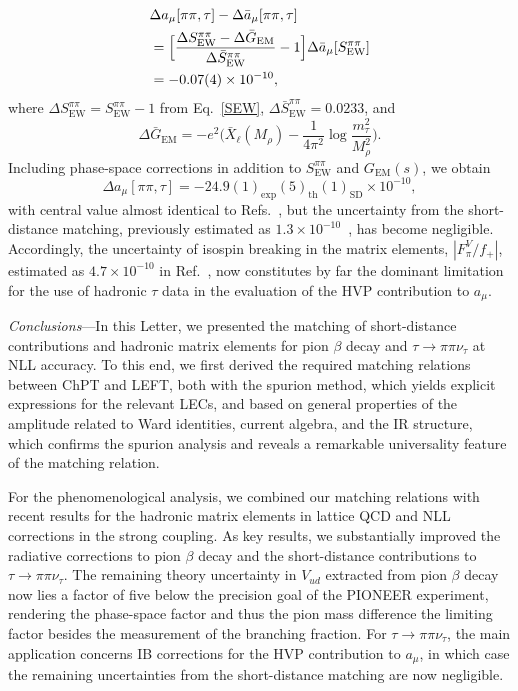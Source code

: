 \documentclass[prl,twocolumn,twoside,preprintnumbers,superscriptaddress,nofootinbib,letterpaper]{revtex4-1}
\newcommand{\beq}{\begin{equation}}
\newcommand{\eeq}{\end{equation}}
\begin{document}
\begin{align}
  &\Delta a_\mu[\pi\pi,\tau]-\Delta \bar a_\mu[\pi\pi,\tau]\notag\\
  &=
  \Big[\frac{\Delta S_\text{EW}^{\pi\pi}-\Delta \bar G_\text{EM}}{\Delta \bar S_\text{EW}^{\pi\pi}}-1\Big]\Delta \bar a_\mu[S_\text{EW}^{\pi\pi}]\notag\\
  &=-0.07(4)\times 10^{-10},
\end{align}
where $\Delta S_\text{EW}^{\pi\pi}=S_\text{EW}^{\pi\pi}-1$ from Eq.~\eqref{SEW}, $\Delta \bar S_\text{EW}^{\pi\pi}=0.0233$, and
\beq
\Delta \bar G_\text{EM}=-e^2\bigg(\bar X_\ell(M_\rho)-\frac{1}{4\pi^2}\log\frac{m_\tau^2}{M_\rho^2}\bigg).
\eeq
Including phase-space corrections in addition to $S_\text{EW}^{\pi\pi}$ and $G_\text{EM}(s)$, we obtain
\beq
\Delta a_\mu[\pi\pi,\tau]=-24.9(1)_\text{exp}(5)_\text{th}(1)_\text{SD}\times 10^{-10},
\eeq
with central value almost identical to Refs.~\cite{Colangelo:2025iad,Colangelo:2025ivq}, but the uncertainty from the short-distance matching, previously estimated as $1.3\times 10^{-10}$~\cite{Aliberti:2025beg},  has become negligible. Accordingly, the uncertainty of isospin breaking in the matrix elements, $|F_\pi^V/f_+|$, estimated as $4.7\times 10^{-10}$ in Ref.~\cite{Aliberti:2025beg}, now constitutes by far the dominant limitation for the use of hadronic $\tau$ data in the evaluation of the HVP contribution to $a_\mu$.


\emph{Conclusions}---In this Letter, we presented
the matching of short-distance contributions and hadronic matrix elements for pion $\beta$ decay and $\tau\to\pi\pi\nu_\tau$ at NLL accuracy. To this end, we first derived the required matching relations between ChPT and LEFT, both with the spurion method, which yields explicit expressions for the relevant LECs, and based on general properties of the amplitude related to Ward identities, current algebra, and the IR structure, which confirms the spurion analysis and reveals a remarkable universality feature of the matching relation.

For the phenomenological analysis, we combined our matching relations with recent results for the hadronic matrix elements in lattice QCD and NLL corrections in the strong coupling. As key results, we substantially improved the radiative corrections to pion $\beta$ decay and the short-distance contributions to $\tau\to\pi\pi\nu_\tau$. The remaining theory uncertainty in $V_{ud}$ extracted from pion $\beta$ decay now lies a factor of five below the precision goal of the PIONEER experiment, rendering the phase-space factor and thus the pion mass difference the limiting factor besides the measurement of the branching fraction.  For $\tau\to\pi\pi\nu_\tau$, the main application concerns IB corrections for the HVP contribution to $a_\mu$, in which case the remaining uncertainties from the short-distance matching are now negligible.
\end{document}

